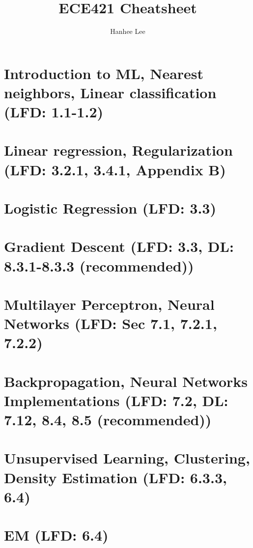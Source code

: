 \documentclass{article}
\title{ECE421 Cheatsheet}
\author{Hanhee Lee}
\begin{document}
\maketitle

\tableofcontents

\listoffigures

\listoftables

\section{Introduction to ML, Nearest neighbors, Linear classification (LFD: 1.1-1.2)}


\section{Linear regression, Regularization (LFD: 3.2.1, 3.4.1, Appendix B)}


\section{Logistic Regression (LFD: 3.3)}


\section{Gradient Descent (LFD: 3.3, DL: 8.3.1-8.3.3 (recommended))}


\section{Multilayer Perceptron, Neural Networks (LFD: Sec 7.1, 7.2.1, 7.2.2)}


\section{Backpropagation, Neural Networks Implementations (LFD: 7.2, DL: 7.12, 8.4, 8.5 (recommended))}


\section{Unsupervised Learning, Clustering, Density Estimation (LFD: 6.3.3, 6.4)}


\section{EM (LFD: 6.4)}

\end{document}
